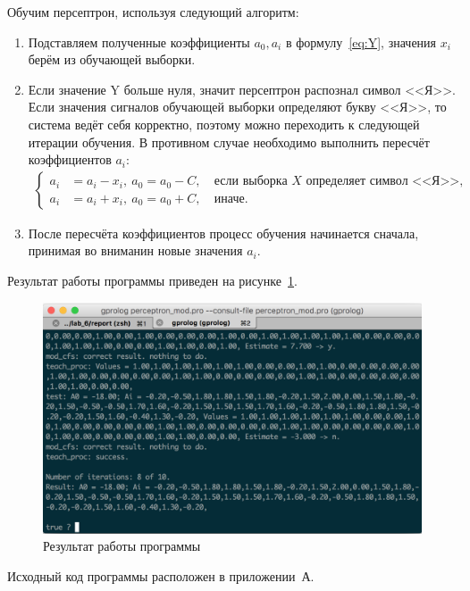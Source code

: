 Обучим персептрон, используя следующий алгоритм:
\begin{enumerate}
  \item Подставляем полученные коэффициенты $a_0, a_i$ в формулу~\eqref{eq:Y},
  значения $x_i$ берём из обучающей выборки.
  \item Если значение Y больше нуля, значит персептрон распознал символ <<Я>>.
  Если значения сигналов обучающей выборки определяют букву <<Я>>,
  то система ведёт себя корректно, поэтому можно переходить к следующей итерации обучения. 
  В противном случае необходимо выполнить пересчёт коэффициентов $a_i$:
  \[
    \begin{array}{lc}
      \left\{
        \begin{matrix}
          a_i &= a_i - x_i, \: a_0 = a_0 - C, \: &\text{если выборка } X \text{ определяет символ <<Я>>}, \\
          a_i &= a_i + x_i, \: a_0 = a_0 + C, \: &\text{иначе}.
        \end{matrix}
      \right.
    \end{array}
  \]
  \item После пересчёта коэффициентов процесс обучения начинается сначала,
  принимая во вниманин новые значения $a_i$.
\end{enumerate}

Результат работы программы приведен на рисунке~\ref{fig:results}.

\begin{figure}[h!]
  \centering
  \includegraphics[width=130mm]{img/results}
  \caption{Результат работы программы}
  \label{fig:results}
\end{figure}

Исходный код программы расположен в приложении~А.

\newpage